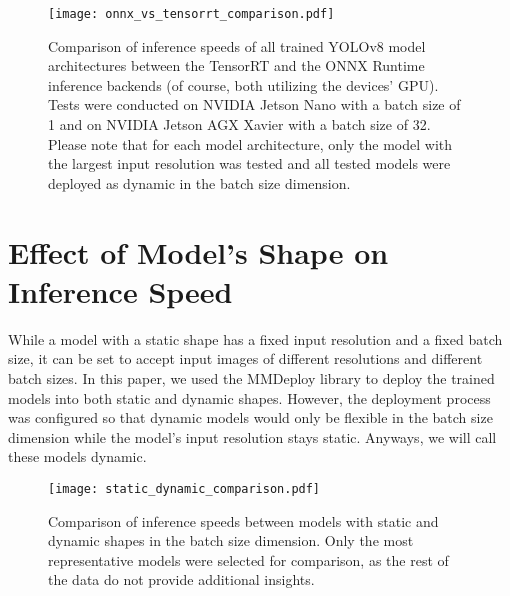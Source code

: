
\begin{figure}[t]
    \begin{framed}
        \centering
        \texttt{[image: onnx\_vs\_tensorrt\_comparison.pdf]}
        \caption{Comparison of inference speeds of all trained YOLOv8 model
        architectures between the TensorRT and the ONNX Runtime inference backends
        (of course, both utilizing the devices' GPU). Tests were conducted on NVIDIA
        Jetson Nano with a batch size of 1 and on NVIDIA Jetson AGX Xavier with a
        batch size of 32. Please note that for each model architecture, only the
        model with the largest input resolution was tested and all tested models were
        deployed as dynamic in the batch size dimension.}
        \label{OrtVsTrtFPS}
    \end{framed}
\end{figure}





\section{Effect of Model's Shape on Inference Speed}

While a model with a static shape has a fixed input resolution and a
fixed batch size, it can be set to accept input images of different resolutions
and different batch sizes. In this paper, we used the MMDeploy library to deploy
the trained models into both static and dynamic shapes. However, the deployment
process was configured so that dynamic models would only be flexible in the
batch size dimension while the model's input resolution stays static. Anyways, we
will call these models dynamic.

\begin{figure}[t]
    \begin{framed}
        \centering
        \texttt{[image: static\_dynamic\_comparison.pdf]}
        \caption{Comparison of inference speeds between models with static and
        dynamic shapes in the batch size dimension. Only the most representative
        models were selected for comparison, as the rest of the data do not
        provide additional insights.}
        \label{StaticDynamicModelShape}
    \end{framed}
\end{figure}

